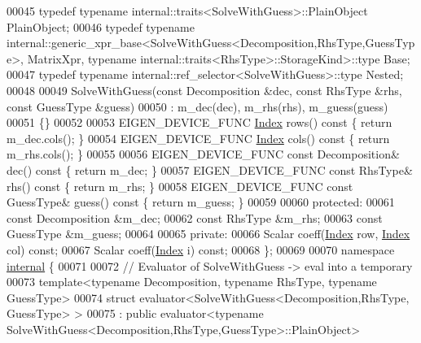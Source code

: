 \begin{DoxyCode}
00045   \textcolor{keyword}{typedef} \textcolor{keyword}{typename} internal::traits<SolveWithGuess>::PlainObject PlainObject;
00046   \textcolor{keyword}{typedef} \textcolor{keyword}{typename} internal::generic\_xpr\_base<SolveWithGuess<Decomposition,RhsType,GuessType>, MatrixXpr, \textcolor{keyword}{
      typename} internal::traits<RhsType>::StorageKind>::type Base;
00047   \textcolor{keyword}{typedef} \textcolor{keyword}{typename} internal::ref\_selector<SolveWithGuess>::type Nested;
00048   
00049   SolveWithGuess(\textcolor{keyword}{const} Decomposition &dec, \textcolor{keyword}{const} RhsType &rhs, \textcolor{keyword}{const} GuessType &guess)
00050     : m\_dec(dec), m\_rhs(rhs), m\_guess(guess)
00051   \{\}
00052   
00053   EIGEN\_DEVICE\_FUNC \hyperlink{namespace_eigen_a62e77e0933482dafde8fe197d9a2cfde}{Index} rows()\textcolor{keyword}{ const }\{ \textcolor{keywordflow}{return} m\_dec.cols(); \}
00054   EIGEN\_DEVICE\_FUNC \hyperlink{namespace_eigen_a62e77e0933482dafde8fe197d9a2cfde}{Index} cols()\textcolor{keyword}{ const }\{ \textcolor{keywordflow}{return} m\_rhs.cols(); \}
00055 
00056   EIGEN\_DEVICE\_FUNC \textcolor{keyword}{const} Decomposition& dec()\textcolor{keyword}{   const }\{ \textcolor{keywordflow}{return} m\_dec; \}
00057   EIGEN\_DEVICE\_FUNC \textcolor{keyword}{const} RhsType&       rhs()\textcolor{keyword}{   const }\{ \textcolor{keywordflow}{return} m\_rhs; \}
00058   EIGEN\_DEVICE\_FUNC \textcolor{keyword}{const} GuessType&     guess()\textcolor{keyword}{ const }\{ \textcolor{keywordflow}{return} m\_guess; \}
00059 
00060 \textcolor{keyword}{protected}:
00061   \textcolor{keyword}{const} Decomposition &m\_dec;
00062   \textcolor{keyword}{const} RhsType       &m\_rhs;
00063   \textcolor{keyword}{const} GuessType     &m\_guess;
00064   
00065 \textcolor{keyword}{private}:
00066   Scalar coeff(\hyperlink{namespace_eigen_a62e77e0933482dafde8fe197d9a2cfde}{Index} row, \hyperlink{namespace_eigen_a62e77e0933482dafde8fe197d9a2cfde}{Index} col) \textcolor{keyword}{const};
00067   Scalar coeff(\hyperlink{namespace_eigen_a62e77e0933482dafde8fe197d9a2cfde}{Index} i) \textcolor{keyword}{const};
00068 \};
00069 
00070 \textcolor{keyword}{namespace }\hyperlink{namespaceinternal}{internal} \{
00071 
00072 \textcolor{comment}{// Evaluator of SolveWithGuess -> eval into a temporary}
00073 \textcolor{keyword}{template}<\textcolor{keyword}{typename} Decomposition, \textcolor{keyword}{typename} RhsType, \textcolor{keyword}{typename} GuessType>
00074 \textcolor{keyword}{struct }evaluator<SolveWithGuess<Decomposition,RhsType, GuessType> >
00075   : \textcolor{keyword}{public} evaluator<typename SolveWithGuess<Decomposition,RhsType,GuessType>::PlainObject>

\end{DoxyCode}
